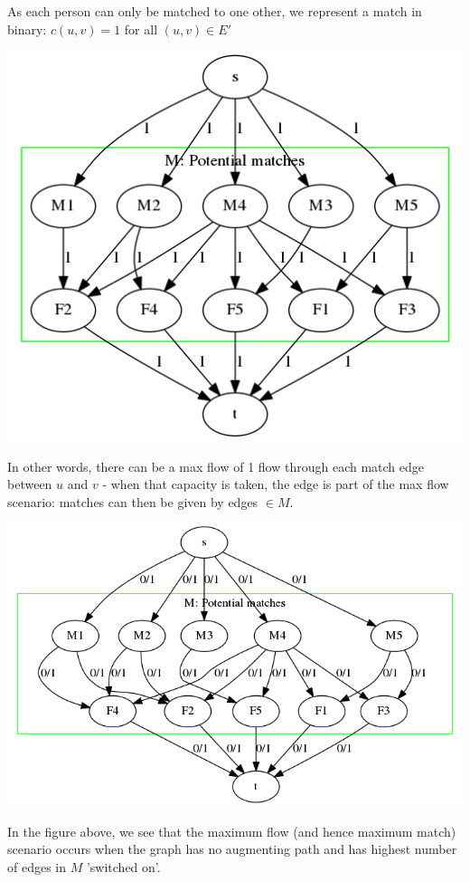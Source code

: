 \documentclass[11pt, a4paper]{article}
\begin{document}
 As each person can only be matched to one other, we represent a match in
 binary: $c(u, v) = 1$ for all $(u, v) \in E'$
 
\includegraphics[scale=0.5]{q1matchset5.png}

In other words, there can be a max flow of 1 flow through each match edge
between $u$ and $v$ - when that capacity is taken, the edge is part of the max
flow scenario: matches can then be given by edges $\in M$.

\includegraphics[scale=0.5]{q1matchset3.png}

In the figure above, we see that the maximum flow (and hence maximum match)
scenario occurs when the graph has no augmenting path and has highest number of
edges in $M$ 'switched on'.
\end{document}
